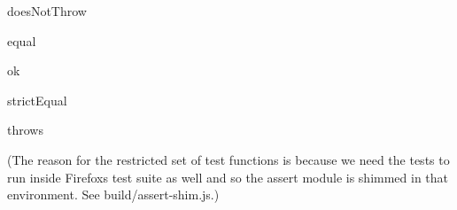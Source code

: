 \begin{DoxyItemize}
\item {\ttfamily does\+Not\+Throw}
\item {\ttfamily equal}
\item {\ttfamily ok}
\item {\ttfamily strict\+Equal}
\item {\ttfamily throws}
\end{DoxyItemize}

(The reason for the restricted set of test functions is because we need the tests to run inside Firefox\textquotesingle{}s test suite as well and so the assert module is shimmed in that environment. See {\ttfamily build/assert-\/shim.\+js}.) 